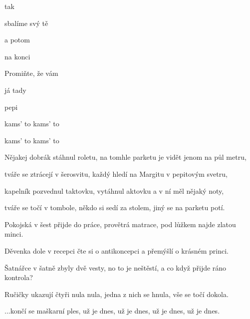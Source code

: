 

\zs
{}    

tak  

sbalíme svý tě  

a potom  

  

na konci  

Promiňte, že vám   

já tady  
\ks

\zr
{} 

 pepi

 

kams' to  kams' to 

kams' to  kams' to 
\kr

\zs
Nějakej dobrák stáhnul roletu, na tomhle parketu je vidět jenom na půl metru,

tváře se ztrácejí v šerosvitu, každý hledí na Margitu v pepitovým svetru,

kapelník pozvednul taktovku, vytáhnul aktovku a v ní měl nějaký noty,

tváře se točí v tombole, někdo si sedí za stolem, jiný se na parketu potí.
\ks

\zr\kr

\zs
Pokojská v šest přijde do práce, provětrá matrace, pod lůžkem najde zlatou minci.

Děvenka dole v recepci čte si o antikoncepci a přemýšlí o krásném princi.

Šatnářce v šatně zbyly dvě vesty, no to je neštěstí, a co když přijde ráno kontrola?

Ručičky ukazují čtyři nula nula, jedna z nich se hnula, vše se točí dokola.
\ks

\zr
...končí se maškarní ples, už je dnes, už je dnes, už je dnes, už je dnes.
\kr

\kp
